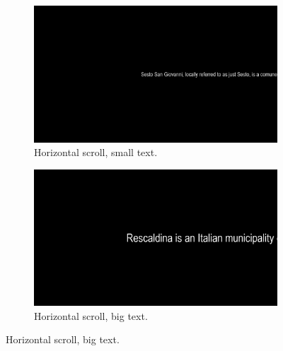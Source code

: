 \documentclass[12pt]{report}
\begin{document}
\begin{figure}[ht]
    \centering
    \begin{subfigure}[b]{0.45\textwidth}
        \centering
        \includegraphics[width=1\textwidth,height=0.6\textwidth]{Images/Experiment/HS_little.png}
        \caption{Horizontal scroll, small text.}
        \label{fig:HS_L}
    \end{subfigure}
    \hfill
    \begin{subfigure}[b]{0.45\textwidth}
        \centering
        \includegraphics[width=1\textwidth,height=0.6\textwidth]{Images/Experiment/HS_big.png}
        \caption{Horizontal scroll, big text.}
        \label{fig:HS_B}
    \end{subfigure}
    
    \vspace{0.5em}
    

\end{figure}
\end{document}
